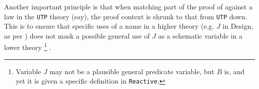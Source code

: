 Another important principle is that when matching part of the proof of
{}
against a law in the \texttt{UTP} theory (say), the proof context is
shrunk to that from \texttt{UTP} down.
This is to ensure that specific uses of a name in a higher theory
(e.g. $J$ in Design, as per {})
does not mask a possible general use of $J$ as a schematic variable
in a lower theory%
\footnote{Variable $J$ may not be a plausible general predicate variable,
but $B$ is, and yet it is given a specific definition in \texttt{Reactive}.}%
.
